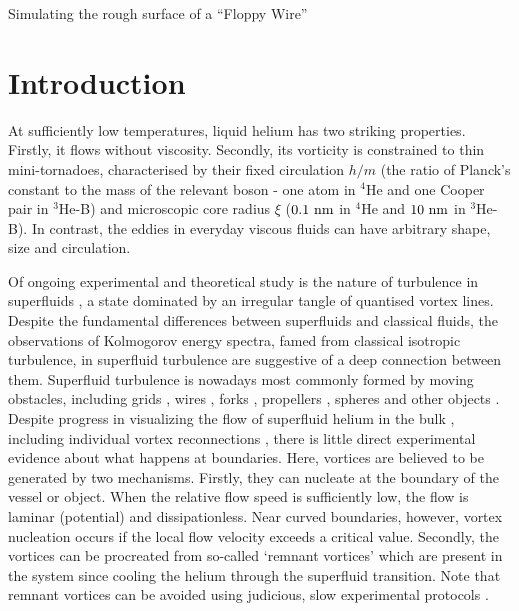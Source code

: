 \begin{chapter}{\label{cha:afm}Simulating the rough surface of a ``Floppy Wire''}
\section{Introduction}
At sufficiently low temperatures, liquid helium has two striking
properties.  Firstly, it flows without viscosity.  Secondly,
its vorticity is constrained to
thin mini-tornadoes, characterised by their fixed circulation
$h/m$ (the ratio of Planck's constant to
the mass of the relevant boson - one atom in $^4$He and one Cooper pair 
in $^3$He-B) and microscopic core radius $\xi$ 
($0.1~\rm nm$ in $^4$He and $10~\rm nm$ in $^3$He-B).  
In contrast, the eddies in everyday viscous fluids can have arbitrary shape, 
size and circulation.  

Of ongoing experimental and theoretical study is the nature of 
turbulence in superfluids 
\cite{Barenghi2014,Bradley11,PhysRevLett.115.155303,PhysRevLett.110.014502}, a state 
dominated by an irregular tangle of quantised vortex lines.  Despite the fundamental differences between superfluids and classical fluids, the observations of Kolmogorov energy spectra, famed from classical isotropic turbulence, in superfluid turbulence \cite{Barenghi2014} are suggestive of a deep connection between them.  Superfluid turbulence is nowadays most commonly formed by moving obstacles, including grids \cite{Davis2000}, wires \cite{Guenault1986,Bradley2005,Bradley2011,Fisher2001}, forks \cite{Blaauwgeers2007,Bradley2012}, propellers \cite{Tabeling1998,Salort}, spheres \cite{Schoepe1995} and other objects \cite{VinenSkrbek2008}.
Despite progress in visualizing the flow of superfluid helium in the
bulk \cite{PhysRevLett.115.155303,PhysRevB.92.064519}, including individual vortex reconnections
\cite{Bewley09}, there is little direct experimental evidence
about what happens at boundaries.
Here, vortices are believed to be generated by two mechanisms.  Firstly, 
they can nucleate at the boundary of the vessel or object.  
When the relative flow speed is sufficiently low, the flow is laminar 
{(potential)} and dissipationless.  
{Near curved boundaries, however, vortex nucleation occurs if
the local flow velocity exceeds a critical value.} 
Secondly, the vortices can be procreated from so-called `remnant vortices' 
which are present in the system since cooling the helium through the superfluid transition.  Note that remnant vortices can be avoided using judicious, slow experimental protocols \cite{PhysRevB.76.020504}. 


\end{chapter}
